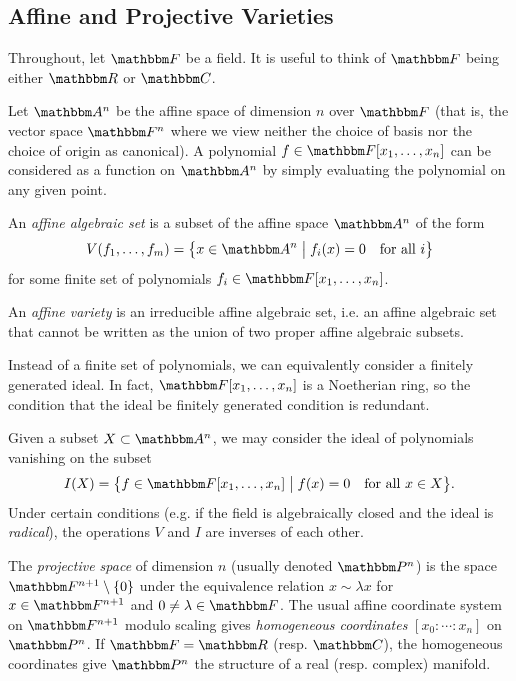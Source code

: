 \documentclass[11pt,titlepage]{article}
\newcommand*{\vbar}{\;\big\vert\;}
\numberwithin{equation}{section}
\begin{document}
\subsection{Affine and Projective Varieties}
    \label{sec:varieties}
    Throughout, let $\F$ be a field.  It is useful to think of $\F$ being either
    $\R$ or $\C$.

    Let $\A^n$ be the affine space of dimension $n$ over $\F$ (that is, the
    vector space $\F^n$ where we view neither the choice of basis nor the choice
    of origin as canonical).  A polynomial $f \in \F[x_1, \ldots, x_n]$ can be
    considered as a function on $\A^n$ by simply evaluating the polynomial on
    any given point.

    \begin{definition}
        An \emph{affine algebraic set} is a subset of the affine space $\A^n$
        of the form
        \[
            V(f_1, \ldots, f_m)
            = \cdil[\big]{x \in \A^n \vbar f_i(x) = 0 \quad\text{for all $i$}}
        \]
        for some finite set of polynomials $f_i \in \F[x_1, \ldots, x_n]$.

        An \emph{affine variety} is an irreducible affine algebraic set, i.e. an
        affine algebraic set that cannot be written as the union of two proper
        affine algebraic subsets.
    \end{definition}
    \noindent Instead of a finite set of polynomials, we can equivalently
    consider a finitely generated ideal.  In fact, $\F[x_1,\ldots,x_n]$ is a
    Noetherian ring, so the condition that the ideal be finitely generated
    condition is redundant.

    Given a subset $X \subset \A^n$, we may consider the ideal of polynomials
    vanishing on the subset
    \[
        I(X) = \cdil[\big]{f \in \F[x_1, \ldots, x_n] \vbar f(x) = 0 \quad\text{for
        all $x \in X$}}.
    \]
    Under certain conditions (e.g. if the field is algebraically closed and the
    ideal is \emph{radical}), the operations $V$ and $I$ are inverses of each other.

    \begin{definition}
        The \emph{projective space} of dimension $n$ (usually denoted $\Proj^n$)
        is the space $\F^{n+1}\setminus \{0\}$ under the equivalence relation $x
        \sim \lambda x$ for $x \in \F^{n+1}$ and $0 \ne \lambda \in \F$.  The
        usual affine coordinate system on $\F^{n+1}$ modulo scaling gives
        \emph{homogeneous coordinates} $[x_0: \cdots: x_n]$ on $\Proj^n$.  If
        $\F = \R$ (resp.  $\C$), the homogeneous coordinates give $\Proj^n$ the
        structure of a real (resp. complex) manifold.
    \end{definition}
\end{document}
